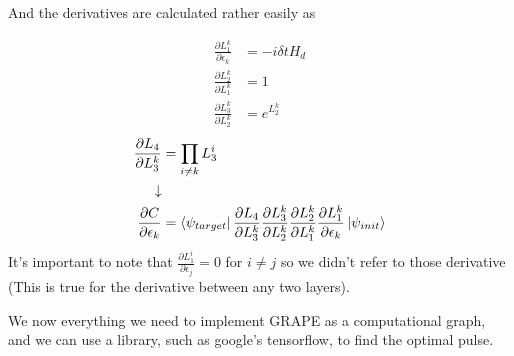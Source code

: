 And the derivatives are calculated rather easily as

\begin{align*}
    \frac{\partial L_1^k}{\partial \epsilon_k} &= -i \delta t H_d\\
    \frac{\partial L_2^k}{\partial L_1^k} &= 1 \\
    \frac{\partial L_3^k}{\partial L_2^k} &= e^{L_2^k} 
\end{align*}
\begin{align*}
    \frac{\partial L_4}{\partial L_3^k} &= \prod_{i \ne k} L_3^i \\
    \downarrow \\
    \frac{\partial C}{\partial \epsilon_k} &= \bra{\psi_{target}}  \frac{\partial L_4}{\partial L_3^k}  \frac{\partial L_3^k}{\partial L_2^k} \frac{\partial L_2^k}{\partial L_1^k}  \frac{\partial L_1^k}{\partial \epsilon_k} \ket{\psi_{init}}
\end{align*}
It's important to note that $\frac{\partial L_1^i}{\partial \epsilon_j} = 0$ for $i \ne j$ so we didn't refer to those derivative (This is true for the derivative between any two layers).

We now everything we need to implement GRAPE as a computational graph, and we can use a library, such as google's tensorflow, to find the optimal pulse.